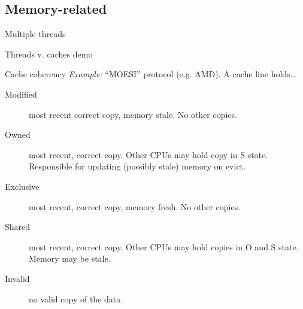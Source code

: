 \documentclass[english,compress]{beamer}
\begin{document}
\subsection{Memory-related}
\begin{frame}{Multiple threads}
  \begin{center}
  \Huge Threads v. caches demo
  \end{center}
\end{frame}
\begin{frame}{Cache coherency}
  \emph{Example:} ``MOESI'' protocol (e.g. AMD). A cache line holds\dots
  \bigskip
  \begin{description}
    \item [Modified] most recent correct copy, memory stale.
      No other copies.
    \item [Owned] most recent, correct copy. Other CPUs may
      hold copy in S state.
      Responsible for updating (possibly stale) memory on evict.

    \item [Exclusive] most recent, correct copy,
      memory fresh. No other copies.
    \item [Shared] most recent, correct copy. Other CPUs may
      hold copies in O and S state. Memory may be stale.
    \item [Invalid] no valid copy of the data.
  \end{description}
  \uncover<+->{}
\end{frame}
\end{document}
